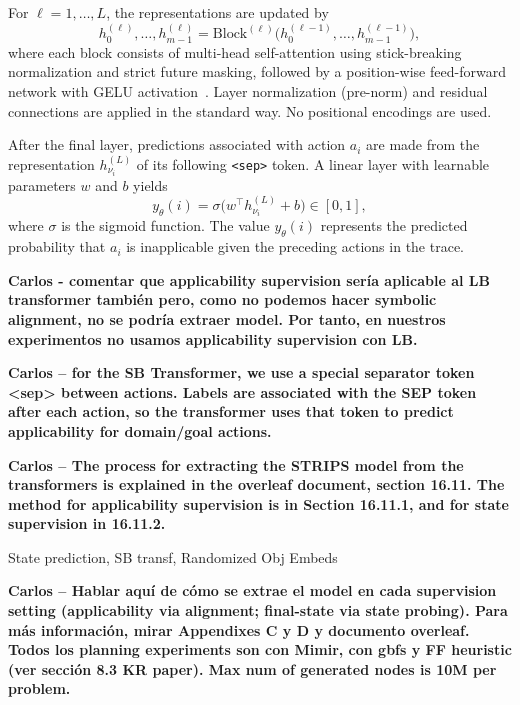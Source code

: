 For $\ell=1,\ldots,L$, the representations are updated by
\[
h_0^{(\ell)},\ldots,h_{m-1}^{(\ell)}
=
\mathrm{Block}^{(\ell)}
\bigl(h_0^{(\ell-1)},\ldots,h_{m-1}^{(\ell-1)}\bigr),
\]
where each block consists of multi-head self-attention using stick-breaking
normalization and strict future masking, followed by a position-wise
feed-forward network with GELU activation~\cite{hendrycks2016gaussian}.
Layer normalization (pre-norm) and residual connections are applied in the
standard way. No positional encodings are used.

After the final layer, predictions associated with action $a_i$ are made
from the representation $h_{\nu_i}^{(L)}$ of its following
\texttt{<sep>} token. A linear layer with learnable parameters $w$ and $b$
yields
\[
y_\theta(i)
=
\sigma\!\bigl(w^\top h_{\nu_i}^{(L)}+b\bigr)
\in[0,1],
\]
where $\sigma$ is the sigmoid function. The value $y_\theta(i)$ represents
the predicted probability that $a_i$ is inapplicable given the preceding
actions in the trace.






\textbf{Carlos - comentar que applicability supervision sería aplicable al LB transformer también pero, como no podemos hacer symbolic alignment, no se podría extraer \strips model. Por tanto, en nuestros experimentos no usamos applicability supervision con LB.}

\textbf{Carlos -- for the SB Transformer, we use a special separator token <sep> between actions. Labels are associated with the SEP token after each action, so the transformer uses that token to predict applicability for domain/goal actions.}

\textbf{Carlos -- The process for extracting the STRIPS model from the transformers is explained in the overleaf document, section 16.11. The method for applicability supervision is in Section 16.11.1, and for state supervision in 16.11.2.}

State prediction, SB transf, Randomized Obj Embeds

\textbf{Carlos -- Hablar aquí de cómo se extrae el \strips model en cada supervision setting (applicability via alignment; final-state via state probing). Para más información, mirar Appendixes C y D y documento overleaf. Todos los planning experiments son con Mimir, con gbfs y FF heuristic (ver sección 8.3 KR paper). Max num of generated nodes is 10M per problem.}